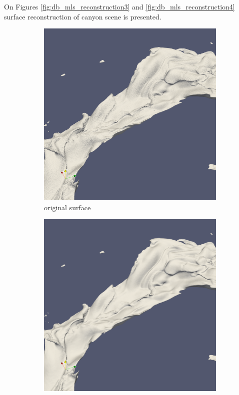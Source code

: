 On Figures \ref{fig:db_mls_reconstruction3} and \ref{fig:db_mls_reconstruction4} surface reconstruction of canyon scene is presented.

\begin{figure}
	\begin{center}
		\begin{subfigure}[b]{0.47\textwidth}
			\includegraphics[width=\textwidth]{figures/CanionOriginal1.png}
			\caption{original surface}
		\end{subfigure}
		\begin{subfigure}[b]{0.47\textwidth}
			\includegraphics[width=\textwidth]{figures/CanionMls1.png}

\end{subfigure}
\end{center}
\end{figure}
